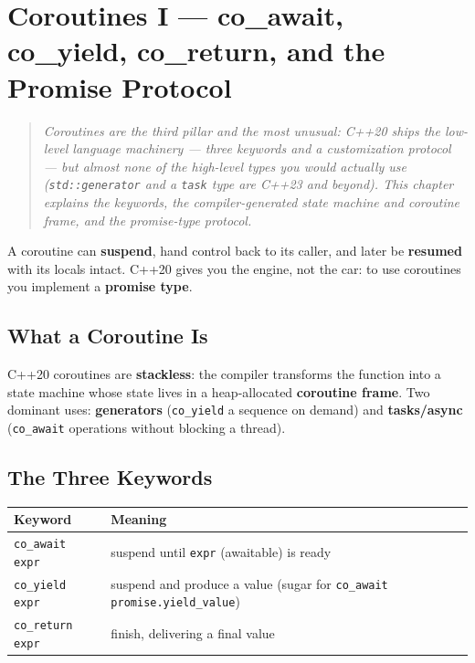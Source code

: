 \chapter{Coroutines I --- co\_await, co\_yield, co\_return, and the Promise Protocol}
\label{ch:c20-coroutines-i}

\begin{quote}
\emph{Coroutines are the third pillar and the most unusual: C++20 ships the low-level language machinery --- three keywords and a customization protocol --- but almost none of the high-level types you would actually use (\texttt{std::generator} and a \texttt{task} type are C++23 and beyond). This chapter explains the keywords, the compiler-generated state machine and coroutine frame, and the promise-type protocol.}
\end{quote}

A coroutine can \textbf{suspend}, hand control back to its caller, and later be \textbf{resumed} with its locals intact. C++20 gives you the engine, not the car: to use coroutines you implement a \textbf{promise type}.

\section{What a Coroutine Is}
\label{sec:c20-what-coroutine}

C++20 coroutines are \textbf{stackless}: the compiler transforms the function into a state machine whose state lives in a heap-allocated \textbf{coroutine frame}. Two dominant uses: \textbf{generators} (\texttt{co\_yield} a sequence on demand) and \textbf{tasks/async} (\texttt{co\_await} operations without blocking a thread).

\section{The Three Keywords}
\label{sec:c20-three-keywords}

\begin{center}
\begin{tabular}{ll}
\hline
\textbf{Keyword} & \textbf{Meaning} \\
\hline
\texttt{co\_await expr} & suspend until \texttt{expr} (awaitable) is ready \\
\texttt{co\_yield expr} & suspend and produce a value (sugar for \texttt{co\_await promise.yield\_value}) \\
\texttt{co\_return expr} & finish, delivering a final value \\
\hline
\end{tabular}
\end{center}


